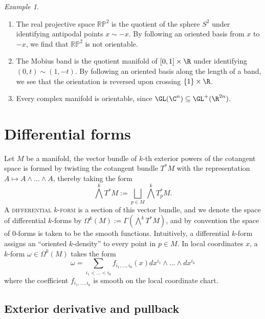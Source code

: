 \documentclass[reqno]{amsart}
\theoremstyle{definition}
\theoremstyle{remark}
\newtheorem*{example}{Example}
\renewcommand{\emph}{\textsc}
\begin{document}
\begin{example}
\leavevmode
\begin{enumerate}
	\item The real projective space $\mathbb{RP}^2$ is the quotient of the sphere $S^2$ under identifying antipodal points $x \sim - x$. By following an oriented basis from $x$ to $-x$, we find that $\mathbb{RP}^2$ is not orientable. 
	
	\item The Mobius band is the quotient manifold of $[0, 1] \times \R$ under identifying $(0, t) \sim (1, -t)$. By following an oriented basis along the length of a band, we see that the orientation is reversed upon crossing $\{1\} \times \R$. 
	
	\item Every complex manifold is orientable, since $\GL (\C^n) \subseteq \GL^+ (\R^{2n})$. 
\end{enumerate}
\end{example}


\section{Differential forms}

Let $M$ be a manifold, the vector bundle of $k$-th exterior powers of the cotangent space is formed by twisting the cotangent bundle $T^*M$ with the representation $A \mapsto A \wedge \dots \wedge A$, thereby taking the form
	\[ \bigwedge^k T^* M := \bigsqcup_{p \in M} \bigwedge^k T^*_p M. \]
A \emph{differential $k$-form} is a section of this vector bundle, and we denote the space of differential $k$-forms by $\Omega^k (M) := \Gamma (\bigwedge^k T^*M)$, and by convention the space of $0$-forms is taken to be the smooth functions. Intuitively, a differential $k$-form assigns an ``oriented $k$-density'' to every point in $p \in M$. In local coordinates $x$, a $k$-form $\omega \in \Omega^k (M)$ takes the form
	\[ \omega = \sum_{i_1 < \dots < i_k} f_{i_1, \dots, i_k} (x) dx^{i_1} \wedge \dots \wedge dx^{i_k}\]
where the coefficient $f_{i_1, \dots, i_k}$ is smooth on the local coordinate chart. 

\subsection{Exterior derivative and pullback}
\end{document}
